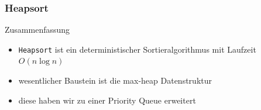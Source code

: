 \documentclass[aspectratio=1610, 11pt]{beamer}
\begin{document}
\begin{frame}\frametitle{Heapsort}
	\begin{exampleblock}{Zusammenfassung}
		\begin{itemize}
			\item {\tt Heapsort} ist ein deterministischer Sortieralgorithmus mit Laufzeit $O(n\log n)$
			\item wesentlicher Baustein ist die max-heap Datenstruktur
			\item diese haben wir zu einer Priority Queue erweitert
		\end{itemize}
	\end{exampleblock}
\end{frame}
\end{document}
